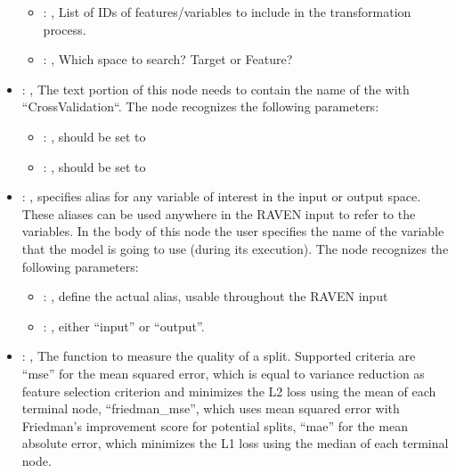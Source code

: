 \begin{itemize}
\begin{itemize}
        \item {}: , 
          List of IDs of features/variables to include in the transformation process.

        \item {}: , 
          Which space to search? Target or Feature?
      \end{itemize}

    \item {}: , 
      The text portion of this node needs to contain the name of the  with
               ``CrossValidation``.
      The  node recognizes the following parameters:
        \begin{itemize}
          \item {}: , 
            should be set to 
          \item {}: , 
            should be set to 
      \end{itemize}

    \item {}: , 
      specifies alias for         any variable of interest in the input or output space. These
      aliases can be used anywhere in the RAVEN input to         refer to the variables. In the body
      of this node the user specifies the name of the variable that the model is going to use
      (during its execution).
      The  node recognizes the following parameters:
        \begin{itemize}
          \item {}: , 
            define the actual alias, usable throughout the RAVEN input
          \item {}: , 
            either ``input'' or ``output''.
      \end{itemize}

    \item {}: , 
      The function to measure the quality of a split. Supported criteria are ``mse'' for the mean
      squared error,                                                  which is equal to variance
      reduction as feature selection criterion and minimizes the L2 loss using the mean of each
      terminal node, ``friedman\_mse'', which uses mean squared error with Friedman's improvement
      score for potential splits,                                                  ``mae'' for the
      mean absolute error, which minimizes the L1 loss using the median of each terminal node.


\end{itemize}
